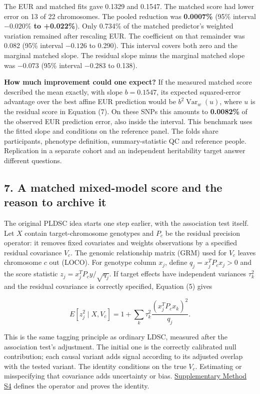 \documentclass[11pt,a4paper]{article}
\let\reportsection\subsection
\newif\ifinsupplement
\renewcommand{\subsection}[1]{\clearpage
  \ifstrequal{#1}{Supplementary Methods}{\insupplementtrue
    \fancyhead[R]{\small\sffamily Supplementary methods}}{}
  \reportsection{#1}}
\begin{document}
The EUR and matched fits gave 0.1329 and 0.1547. The matched score had lower error on 13 of 22 chromosomes. The pooled reduction was \textbf{0.0007\%} (95\% interval \textbf{\(-0.020\%\) to +0.022\%}). Only 0.734\% of the matched predictor's weighted variation remained after rescaling EUR. The coefficient on that remainder was 0.082 (95\% interval \(-0.126\) to 0.290). This interval covers both zero and the marginal matched slope. The residual slope minus the marginal matched slope was \(-0.073\) (95\% interval \(-0.283\) to 0.138).

\textbf{How much improvement could one expect?} If the measured matched score described the mean exactly, with slope \(b=0.1547\), its expected squared-error advantage over the best affine EUR prediction would be \(b^2\operatorname{Var}_w(u)\), where \(u\) is the residual score in Equation (7). On these SNPs this amounts to \textbf{0.0082\%} of the observed EUR prediction error, also inside the interval. This benchmark uses the fitted slope and conditions on the reference panel. The folds share participants, phenotype definition, summary-statistic QC and reference people. Replication in a separate cohort and an independent heritability target answer different questions.

\subsection{7. A matched mixed-model score and the reason to archive it}\label{7-a-matched-mixed-model-score-and-the-reason-to-archive-it}

The original PLDSC idea starts one step earlier, with the association test itself. Let \(X\) contain target-chromosome genotypes and \(P_c\) be the residual precision operator: it removes fixed covariates and weights observations by a specified residual covariance \(V_c\). The genomic relationship matrix (GRM) used for \(V_c\) leaves chromosome \(c\) out (LOCO). For genotype column \(x_j\), define \(q_j=x_j^TP_cx_j>0\) and the score statistic \(z_j=x_j^TP_cy/\sqrt{q_j}\). If target effects have independent variances \(\tau_k^2\) and the residual covariance is correctly specified, Equation (5) gives

\[
E[z_j^2\mid X,V_c]=1+\sum_k\tau_k^2
             \frac{(x_j^TP_c x_k)^2}{q_j}. \tag{5}
\]

This is the same tagging principle as ordinary LDSC, measured after the association test's adjustment. The initial one is the correctly calibrated null contribution; each causal variant adds signal according to its adjusted overlap with the tested variant. The identity conditions on the true \(V_c\). Estimating or misspecifying that covariance adds uncertainty or bias. \hyperref[s4-the-matched-mixed-model-identity]{Supplementary Method S4} defines the operator and proves the identity.
\end{document}
